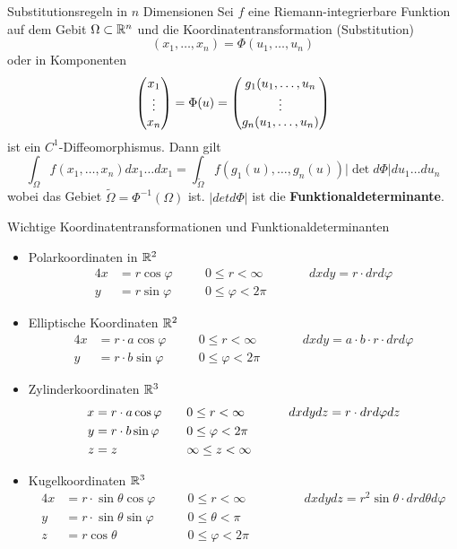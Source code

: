 \begin{Satz}{Substitutionsregeln in $n$ Dimensionen}{}
    Sei $f$ eine Riemann-integrierbare Funktion auf dem Gebit $\Omega \subset \mathbb{R}^n$ und die Koordinatentransformation (Substitution)
    \[
    (x_1,\hdots,x_n) = \Phi(u_1, \hdots,  u_n)
    \]
    oder in Komponenten
    \[
        \begin{pmatrix} x_1 \\ \vdots \\ x_n \end{pmatrix}
        = \Phi(u)
        = \begin{pmatrix} g_1(u_1,\hdots,u_n \\ \vdots \\ g_n(u_1,\hdots,u_n) \end{pmatrix}
    \]
    ist ein $C^1$-Diffeomorphismus. Dann gilt
    \[
        \int_\Omega f(x_1, \hdots, x_n)dx_1\hdots dx_1 = \int_{\widetilde{\Omega}} f(g_1(u), \hdots, g_n(u))|\det d \Phi | du_1\hdots du_n
    \]
    wobei das Gebiet $\widetilde{\Omega} = \Phi^{-1}(\Omega)$ ist. $|det d\Phi|$ ist die \textbf{Funktionaldeterminante}.
\end{Satz}

\begin{Rechenregeln}{Wichtige Koordinatentransformationen und Funktionaldeterminanten}{}
    \begin{itemize}
       \item Polarkoordinaten in $\mathbb{R}^2$ \begin{alignat*}{4}
            x &= r \cos \varphi\quad &&0 \leq r < \infty\quad &&&dxdy = r \cdot drd\varphi\\
            y &= r \sin \varphi\quad &&0 \leq \varphi < 2\pi\quad
        \end{alignat*}
        \item Elliptische Koordinaten $\mathbb{R}^2$ \begin{alignat*}{4}
            x &= r \cdot  a \cos \varphi\quad &&0 \leq r < \infty\quad &&&dxdy = a \cdot b \cdot  r \cdot drd\varphi\\
            y &= r \cdot b \sin \varphi\quad &&0 \leq \varphi < 2\pi\quad
        \end{alignat*}
        \item Zylinderkoordinaten $\mathbb{R}^3$ \begin{alignat*}{4}
            x &= r \cdot  a \cos \varphi\quad &&0 \leq r < \infty\quad &&&dxdydz = r \cdot drd\varphi dz\\
            y &= r \cdot b \sin \varphi\quad &&0 \leq \varphi < 2\pi\quad\\
            z &= z\quad &&\-\infty \leq z < \infty\quad
        \end{alignat*}
        \item Kugelkoordinaten $\mathbb{R}^3$ \begin{alignat*}{4}
            x &= r \cdot \sin \theta \cos \varphi \quad &&0 \leq r < \infty\quad &&&dxdydz = r^2 \sin \theta \cdot drd\theta d\varphi\\
            y &= r \cdot \sin \theta \sin \varphi \quad && 0 \leq \theta < \pi\quad\\
            z &= r \cos \theta \quad &&0 \leq \varphi < 2\pi\quad\quad
        \end{alignat*}
   \end{itemize}
\end{Rechenregeln}